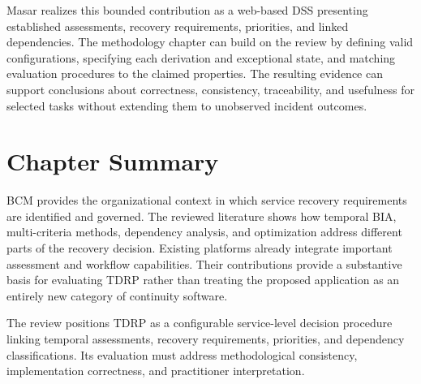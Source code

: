 Masar realizes this bounded contribution as a web-based DSS presenting established assessments, recovery requirements, priorities, and linked dependencies. The methodology chapter can build on the review by defining valid configurations, specifying each derivation and exceptional state, and matching evaluation procedures to the claimed properties. The resulting evidence can support conclusions about correctness, consistency, traceability, and usefulness for selected tasks without extending them to unobserved incident outcomes.

\section{Chapter Summary}
\label{sec:lr_summary}

BCM provides the organizational context in which service recovery requirements are identified and governed. The reviewed literature shows how temporal BIA, multi-criteria methods, dependency analysis, and optimization address different parts of the recovery decision. Existing platforms already integrate important assessment and workflow capabilities. Their contributions provide a substantive basis for evaluating TDRP rather than treating the proposed application as an entirely new category of continuity software.

The review positions TDRP as a configurable service-level decision procedure linking temporal assessments, recovery requirements, priorities, and dependency classifications. Its evaluation must address methodological consistency, implementation correctness, and practitioner interpretation.

